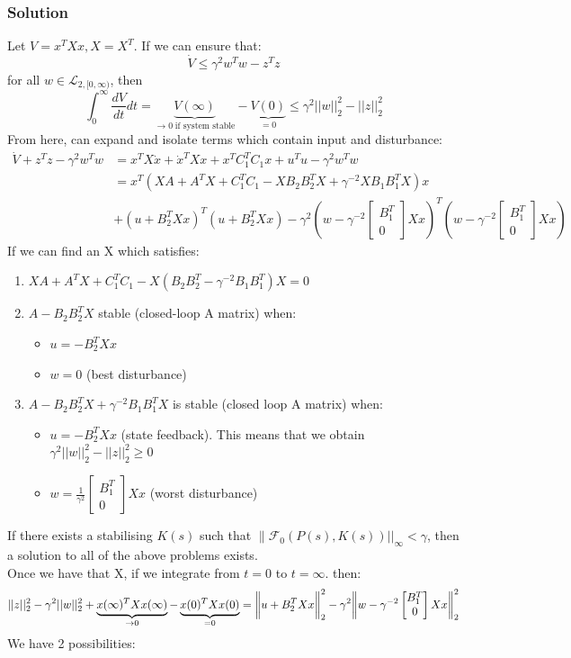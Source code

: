 \documentclass{article}
\begin{document}
\subsubsection*{Solution}
Let $V = x^TXx, X = X^T$. If we can ensure that:
\[
\dot V \leq \gamma^2 w^Tw - z^Tz
\]
for all $w \in \mathcal{L}_{2,[0,\infty)}$, then
\[
\int_0^\infty \frac{dV}{dt}dt = \underbrace{V(\infty)}_{\rightarrow 0 \; \text{if system stable}} - \underbrace{V(0)}_{=0} \leq \gamma^2 ||w||_2^2 - ||z||_2^2
\]
From here, can expand and isolate terms which contain input and disturbance:
\[
\begin{aligned}
\dot V + z^Tz - \gamma^2 w^Tw &= x^TX \dot x + \dot x^T Xx + x^TC_1^T C_1 x + u^Tu - \gamma ^2 w^Tw  \\
&= x^T(XA + A^TX + C_1^TC_1 - XB_2B_2^TX + \gamma^{-2}XB_1B_1^TX)x \\
&+ (u+B_2^TXx)^T(u+B_2^TXx) - \gamma^2(w - \gamma^{-2}\begin{bmatrix}
    B_1^T \\ 0
\end{bmatrix}
Xx)^T
(w - \gamma^{-2} \begin{bmatrix}
    B_1^T \\ 0
\end{bmatrix} Xx)
\end{aligned}
\]
If we can find an X which satisfies:
\begin{enumerate}
    \item $XA + A^TX + C_1^TC_1 - X(B_2B_2^T - \gamma^{-2}B_1B_1^T)X = 0$
    \item $A-B_2B_2^TX$ stable (closed-loop A matrix) when:
    \begin{itemize}
        \item $u = -B_2^TXx$ 
        \item $w = 0$ (best disturbance)
    \end{itemize}
    \item $A-B_2B_2^TX + \gamma^{-2} B_1B_1^TX$ is stable (closed loop A matrix) when:
    \begin{itemize}
        \item $u = -B_2^TXx$ (state feedback). This means that we obtain $\gamma^2 ||w||_2^2 - ||z||_2^2 \geq 0$
        \item $w = \frac{1}{\gamma^2}\begin{bmatrix}
            B_1^T \\ 0
        \end{bmatrix} Xx$ (worst disturbance)
    \end{itemize}
\end{enumerate}
If there exists a stabilising $K(s)$ such that $\| \mathcal{F_0}(P(s),K(s))||_\infty < \gamma$, then a solution to all of the above problems exists. \\
Once we have that X, if we integrate from $t=0$ to $t=\infty$. then:
\[
||z||_2^2 - \gamma^2 ||w||_2^2 + \underbrace{x(\infty)^TXx(\infty)}_{\rightarrow 0} - \underbrace{x(0)^TXx(0)}_{=0} =  \norm \bigg{u+B_2^TXx}_2^2 - \gamma^2 \norm \bigg{w-\gamma^{-2}\begin{bmatrix}
    B_1^T \\ 0
\end{bmatrix} Xx}_2^2
\]
We have 2 possibilities:
\end{document}
